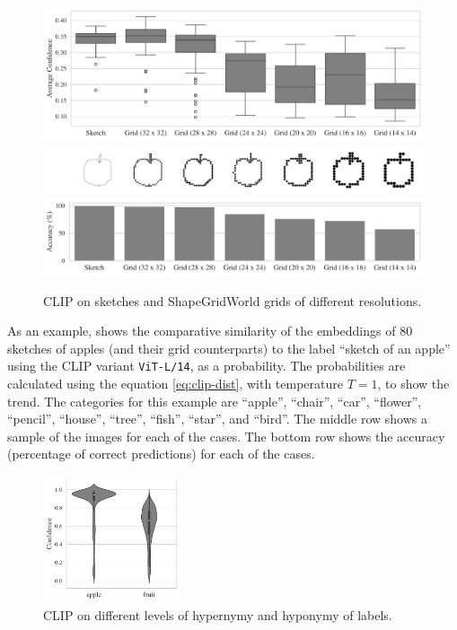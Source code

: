 \begin{figure}[H]
    \centering
    \includegraphics[width=\textwidth]{images/grid_comparison.pdf}
    \includegraphics[width=\textwidth]{images/grid_comparison_images.png}
    \includegraphics[width=\textwidth]{images/grid_comparison_accuracy.pdf}
    \caption{CLIP on sketches and ShapeGridWorld grids of different resolutions.}
    \label{fig:clip-sketches}
\end{figure}

As an example,  shows the comparative similarity of the embeddings of \(80\) sketches of apples (and their grid counterparts) to the label ``sketch of an apple'' using the CLIP variant \texttt{ViT-L/14}, as a probability.
The probabilities are calculated using the equation \eqref{eq:clip-dist}, with temperature \(T = 1\), to show the trend.
The categories for this example are ``apple'', ``chair'', ``car'', ``flower'', ``pencil'', ``house'', ``tree'', ``fish'', ``star'', and ``bird''.
The middle row shows a sample of the images for each of the cases.
The bottom row shows the accuracy (percentage of correct predictions) for each of the cases.

\begin{figure}
    \centering
    \includegraphics[width=0.36\textwidth]{images/hypercategory_comparison_2.pdf}
    \caption{CLIP on different levels of hypernymy and hyponymy of labels.}
    \label{fig:clip-hypercategory}
\end{figure}

